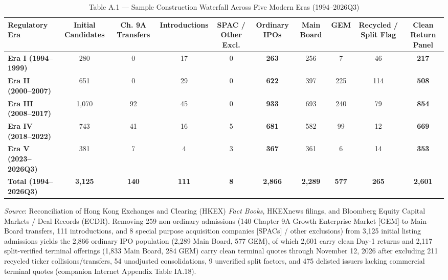 \documentclass[11pt,letterpaper]{article}
\begin{document}
\begin{table}[!htbp]
\centering
\caption*{Table A.1 — Sample Construction Waterfall Across Five Modern Eras (1994–2026Q3)}
\begin{adjustbox}{max width=\textwidth,max totalheight=0.79\textheight}
\begin{minipage}{\textwidth}\centering
\scriptsize
\setlength{\tabcolsep}{3.5pt}
\renewcommand{\arraystretch}{1.18}
\begin{adjustbox}{max width=\textwidth}
\begin{tabular}{lccccccccc}
\toprule
Regulatory Era & Initial Candidates & Ch. 9A Transfers & Introductions & SPAC / Other Excl. & \textbf{Ordinary IPOs} & Main Board & GEM & Recycled / Split Flag & \textbf{Clean Return Panel} \\
\midrule
\textbf{Era I (1994–1999)} & 280 & 0 & 17 & 0 & \textbf{263} & 256 & 7 & 46 & \textbf{217} \\
\textbf{Era II (2000–2007)} & 651 & 0 & 29 & 0 & \textbf{622} & 397 & 225 & 114 & \textbf{508} \\
\textbf{Era III (2008–2017)} & 1,070 & 92 & 45 & 0 & \textbf{933} & 693 & 240 & 79 & \textbf{854} \\
\textbf{Era IV (2018–2022)} & 743 & 41 & 16 & 5 & \textbf{681} & 582 & 99 & 12 & \textbf{669} \\
\textbf{Era V (2023–2026Q3)} & 381 & 7 & 4 & 3 & \textbf{367} & 361 & 6 & 14 & \textbf{353} \\
\textbf{Total (1994–2026Q3)} & \textbf{3,125} & \textbf{140} & \textbf{111} & \textbf{8} & \textbf{2,866} & \textbf{2,289} & \textbf{577} & \textbf{265} & \textbf{2,601} \\
\bottomrule
\end{tabular}
\end{adjustbox}
\end{minipage}
\end{adjustbox}
\par\vspace{3pt}\noindent\parbox{\textwidth}{\scriptsize\raggedright \textit{Source}: Reconciliation of Hong Kong Exchanges and Clearing (HKEX) \textit{Fact Books}, HKEXnews filings, and Bloomberg Equity Capital Markets / Deal Records (ECDR). Removing 259 non-ordinary admissions (140 Chapter 9A Growth Enterprise Market [GEM]-to-Main-Board transfers, 111 introductions, and 8 special purpose acquisition companies [SPACs] / other exclusions) from 3,125 initial listing admissions yields the 2,866 ordinary IPO population (2,289 Main Board, 577 GEM), of which 2,601 carry clean Day-1 returns and 2,117 split-verified terminal offerings (1,833 Main Board, 284 GEM) carry clean terminal quotes through November 12, 2026 after excluding 211 recycled ticker collisions/transfers, 54 unadjusted consolidations, 9 unverified split factors, and 475 delisted issuers lacking commercial terminal quotes (companion Internet Appendix Table IA.18).}
\end{table}
\end{document}
